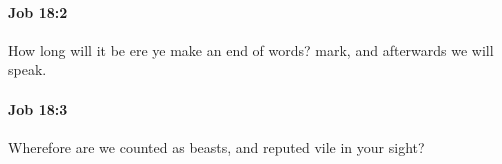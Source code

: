 		\paragraph{Job 18:2} %
			\label{JOB-18-2}

			How long will it be ere ye make an end of words? mark, and afterwards we will speak.


		\paragraph{Job 18:3} %
			\label{JOB-18-3}

			Wherefore are we counted as beasts, and reputed vile in your sight?


